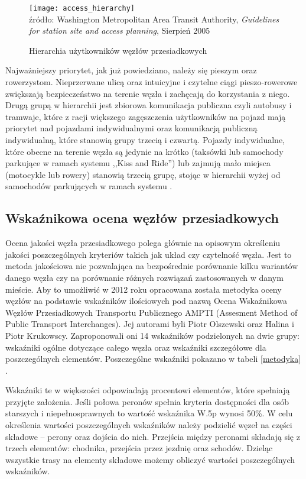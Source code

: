 \documentclass[twoside,12pt]{article}
\begin{document}
	\begin{figure}[H]
		\centering
		\caption{Hierarchia użytkowników węzłów przesiadkowych}
		\texttt{[image: access\_hierarchy]}\\
		\footnotesize{źródło: Washington Metropolitan Area Transit Authority, \emph{Guidelines for station site and access planning}, Sierpień 2005 \cite{guidelines_washington}}
		\label{access-hierarchy}
	\end{figure}
	
	Najważniejszy priorytet, jak już powiedziano, należy się pieszym oraz rowerzystom. Nieprzerwane ulicą oraz intuicyjne i czytelne ciągi pieszo-rowerowe zwiększają bezpieczeństwo na terenie węzła i zachęcają do korzystania z niego. Drugą grupą w hierarchii jest zbiorowa komunikacja publiczna czyli autobusy i tramwaje, które z racji większego zagęszczenia użytkowników na pojazd mają priorytet nad pojazdami indywidualnymi oraz komunikacją publiczną indywidualną, które stanowią grupy trzecią i czwartą. Pojazdy indywidualne, które obecne na terenie węzła są jedynie na krótko (taksówki lub samochody parkujące w ramach systemu ,,Kiss and Ride'') lub zajmują mało miejsca (motocykle lub rowery) stanowią trzecią grupę, stojąc w hierarchii wyżej od samochodów parkujących w ramach systemu \pnr{} \cite{guidelines_washington}.
	
	\subsection{Wskaźnikowa ocena węzłów przesiadkowych}
	
	Ocena jakości węzła przesiadkowego polega głównie na opisowym określeniu jakości poszczególnych kryteriów takich jak układ czy czytelność węzła. Jest to metoda jakościowa nie pozwalająca na bezpośrednie porównanie kilku wariantów danego węzła czy na porównanie różnych rozwiązań zastosowanych w danym mieście. Aby to umożliwić w 2012 roku opracowana została metodyka oceny węzłów na podstawie wskaźników ilościowych pod nazwą Ocena Wskaźnikowa Węzłów Przesiadkowych Transportu Publicznego AMPTI (Assesment Method of Public Transport Interchanges). Jej autorami byli Piotr Olszewski oraz Halina i Piotr Krukowscy. Zaproponowali oni 14 wskaźników podzielonych na dwie grupy: wskaźniki ogólne dotyczące całego węzła oraz wskaźniki szczegółowe dla poszczególnych elementów. Poszczególne wskaźniki pokazano w tabeli \ref{metodyka} \cite{metodyka}. 
	
	Wskaźniki te w większości odpowiadają procentowi elementów, które spełniają przyjęte założenia. Jeśli połowa peronów spełnia kryteria dostępności dla osób starszych i niepełnosprawnych to wartość wskaźnika W.5p wynosi 50\%. W celu określenia wartości poszczególnych wskaźników należy podzielić węzeł na części składowe -- perony oraz dojścia do nich. Przejścia między peronami składają się z trzech elementów: chodnika, przejścia przez jezdnię oraz schodów. Dzieląc wszystkie trasy na elementy składowe możemy obliczyć wartości poszczególnych wskaźników.
	
\end{document}
